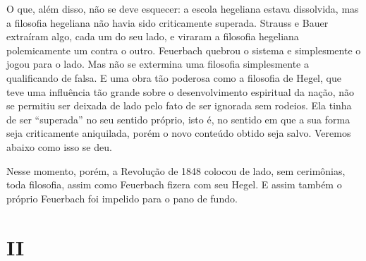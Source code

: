 O que, além disso, não se deve esquecer: a escola
hegeliana estava dissolvida, mas a filosofia hegeliana não havia sido criticamente
superada. Strauss e Bauer extraíram
algo, cada um do seu lado, e viraram a filosofia hegeliana polemicamente
um contra o
outro. Feuerbach quebrou
o sistema e simplesmente o jogou para o lado. Mas não se extermina uma
filosofia simplesmente a qualificando de falsa. E uma obra tão poderosa
como a filosofia
de Hegel,
que teve uma influência tão grande sobre o desenvolvimento espiritual da
nação, não se permitiu ser deixada de lado pelo fato de ser ignorada sem
rodeios. Ela tinha de ser ``superada'' no seu sentido 
próprio, isto é, no sentido em que a sua forma seja criticamente %
aniquilada, porém o novo conteúdo obtido seja salvo. %
Veremos abaixo como isso se deu.

Nesse momento, porém, a Revolução de 1848 colocou de lado, sem %
cerimônias, toda filosofia, assim como Feuerbach fizera com seu Hegel. E assim também o próprio Feuerbach foi impelido para o pano de fundo.

\quebra

\mbox{}
\vspace{2cm}

\section{II}

